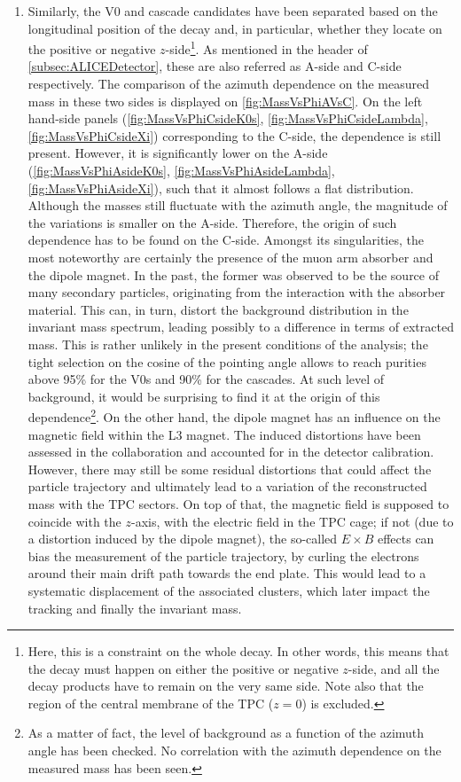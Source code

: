 \begin{enumerate}
\item Similarly, the V0 and cascade candidates have been separated based on the longitudinal position of the decay and, in particular, whether they locate on the positive or negative $z$-side\footnote{Here, this is a constraint on the whole decay. In other words, this means that the decay must happen on either the positive or negative $z$-side, and all the decay products have to remain on the very same side. Note also that the region of the central membrane of the TPC ($z = 0$) is excluded.}. As mentioned in the header of \Sec\ref{subsec:ALICEDetector}, these are also referred as A-side and C-side respectively. The comparison of the azimuth dependence on the measured mass in these two sides is displayed on \fig\ref{fig:MassVsPhiAVsC}. On the left hand-side panels (\figs\ref{fig:MassVsPhiCsideK0s}, \ref{fig:MassVsPhiCsideLambda}, \ref{fig:MassVsPhiCsideXi}) corresponding to the C-side, the dependence is still present. However, it is significantly lower on the A-side (\figs\ref{fig:MassVsPhiAsideK0s}, \ref{fig:MassVsPhiAsideLambda}, \ref{fig:MassVsPhiAsideXi}), such that it almost follows a flat distribution. Although the \rmKzeroS masses still fluctuate with the azimuth angle, the magnitude of the variations is smaller on the A-side. Therefore, the origin of such dependence has to be found on the C-side. Amongst its singularities, the most noteworthy are certainly the presence of the muon arm absorber and the dipole magnet. In the past, the former was observed to be the source of many secondary particles, originating from the interaction with the absorber material. This can, in turn, distort the background distribution in the invariant mass spectrum, leading possibly to a difference in terms of extracted mass. This is rather unlikely in the present conditions of the analysis; the tight selection on the cosine of the pointing angle allows to reach purities above 95\% for the V0s and 90\% for the cascades. At such level of background, it would be surprising to find it at the origin of this dependence\footnote{As a matter of fact, the level of background as a function of the azimuth angle has been checked. No correlation with the azimuth dependence on the measured mass has been seen.}. On the other hand, the dipole magnet has an influence on the magnetic field within the L3 magnet. The induced distortions have been assessed in the collaboration and accounted for in the detector calibration. However, there may still be some residual distortions that could affect the particle trajectory and ultimately lead to a variation of the reconstructed mass with the TPC sectors. On top of that, the magnetic field is supposed to coincide with the $z$-axis, with the electric field in the TPC cage; if not (due to a distortion induced by the dipole magnet), the so-called $E\times B$ effects can bias the measurement of the particle trajectory, by curling the electrons around their main drift path towards the end plate. This would lead to a systematic displacement of the associated clusters, which later impact the tracking and finally the invariant mass.
\end{enumerate}


